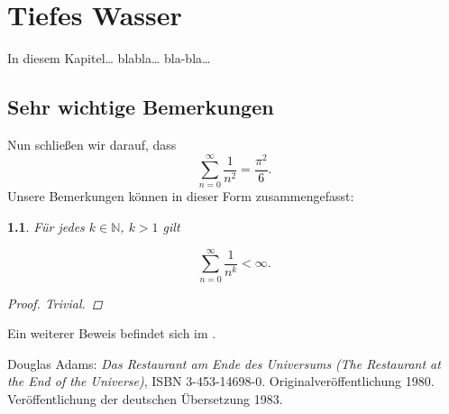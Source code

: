 \documentclass[12pt,a4paper,oneside,naustrian]{amsbook}
\numberwithin{section}{chapter}
\numberwithin{equation}{section}
\numberwithin{figure}{section}
\theoremstyle{plain}
\theoremstyle{plain}
\newtheorem{prop}[thm]{\protect\propositionname}
\providecommand{\propositionname}{Satz}
\begin{document}
\chapter{Tiefes Wasser}

In diesem Kapitel\ldots{} blabla\ldots{} bla-bla\ldots{} \lipsum[31]

\section{Sehr wichtige Bemerkungen}

\lipsum[33-35]

Nun schließen wir darauf, dass
\[
\sum_{n=0}^{\infty}\frac{1}{n^{2}}=\frac{\pi^{2}}{6}.
\]
Unsere Bemerkungen können in dieser Form zusammengefasst:
\begin{prop}
Für jedes $k\in\mathbb{N}$, $k>1$ gilt

\[
\sum_{n=0}^{\infty}\frac{1}{n^{k}}<\infty.
\]

\begin{proof}
Trivial.
\end{proof}
\end{prop}

Ein weiterer Beweis befindet sich im \citet{Adams1980}.
\begin{thebibliography}{}
Douglas Adams: \emph{Das Restaurant am Ende
des Universums} \emph{(The Restaurant at the End of the Universe)},
ISBN 3-453-14698-0. Originalveröffentlichung 1980. Veröffentlichung
der deutschen Übersetzung 1983.

\end{thebibliography}
\end{document}
